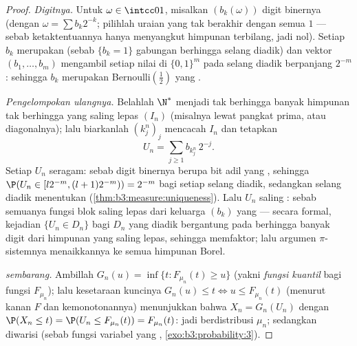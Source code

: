 \begin{proof}
\emph{Digitnya.} Untuk $\omega \in \intcc01$, misalkan $(b_k(\omega))$
digit binernya (dengan $\omega = \sum b_k2^{-k}$; pilihlah
uraian yang tak berakhir dengan semua $1$ --- sebab ketaktentuannya hanya menyangkut
himpunan terbilang, jadi nol). Setiap $b_k$ merupakan  (sebab $\{b_k = 1\}$ gabungan berhingga selang
diadik) dan vektor $(b_1, \dots, b_m)$ mengambil setiap
nilai di $\{0,1\}^m$ pada selang diadik berpanjang $2^{-m}$:
sehingga $b_k$ merupakan Bernoulli$(\frac12)$ yang .

\emph{Pengelompokan ulangnya.} Belahlah $\N^*$ menjadi tak berhingga banyak
himpunan tak berhingga yang saling lepas $(I_n)$ (misalnya lewat pangkat prima, atau diagonalnya);
lalu biarkanlah $(k^n_j)_j$ mencacah $I_n$ dan tetapkan
\[
U_n = \sum_{j\geq1} b_{k^n_j}\,2^{-j} .
\]
Setiap $U_n$ seragam: sebab digit binernya berupa bit adil yang
, sehingga $\P(U_n \in [l2^{-m}, (l+1)2^{-m})) = 2^{-m}$ bagi
setiap selang diadik, sedangkan selang diadik menentukan 
(\cref{thm:b3:measure:uniqueness}). Lalu $U_n$ saling :
sebab semuanya fungsi blok saling lepas dari keluarga
$(b_k)$ yang  --- secara formal, kejadian $\{U_n \in D_n\}$ bagi
$D_n$ yang diadik bergantung pada berhingga banyak digit dari himpunan
yang saling lepas, sehingga memfaktor; lalu argumen $\pi$-sistemnya menaikkannya ke
semua himpunan Borel.

\emph{ sembarang.} Ambillah $G_n(u) = \inf\{t : F_{\mu_n}(t)
\geq u\}$ (yakni \emph{fungsi kuantil} bagi fungsi
 $F_{\mu_n}$); lalu kesetaraan kuncinya $G_n(u) \leq t
\iff u \leq F_{\mu_n}(t)$ (menurut  kanan $F$ dan
kemonotonannya) menunjukkan bahwa $X_n = G_n(U_n)$  dengan
$\P(X_n \leq t) = \P(U_n \leq F_{\mu_n}(t)) =
F_{\mu_n}(t)$: jadi berdistribusi $\mu_n$; sedangkan  diwarisi
(sebab fungsi variabel yang ,
\cref{exo:b3:probability:3}).
\end{proof}

